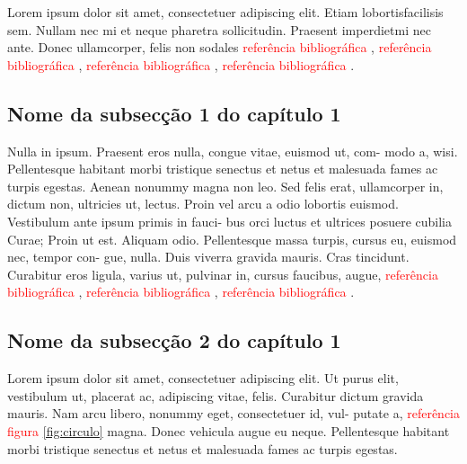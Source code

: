 Lorem  ipsum  dolor  sit  amet,  consectetuer  adipiscing elit. Etiam  lobortisfacilisis sem.  Nullam nec mi et neque pharetra sollicitudin. Praesent imperdietmi nec ante. Donec ullamcorper, felis non sodales \textcolor{red}{referência bibliográfica} \cite{einstein}, \textcolor{red}{referência bibliográfica} \cite{dirac}, \textcolor{red}{referência bibliográfica} \cite{latexcompanion}, \textcolor{red}{referência bibliográfica} \cite{knuthwebsite}.

\subsection{Nome da subsecção 1 do capítulo 1}
Nulla in ipsum. Praesent eros nulla, congue vitae, euismod ut, com- modo a, wisi. Pellentesque habitant morbi tristique senectus et netus et malesuada fames ac turpis egestas. Aenean nonummy magna non leo. Sed felis erat, ullamcorper in, dictum non, ultricies ut, lectus. Proin vel arcu a odio lobortis euismod. Vestibulum ante ipsum primis in fauci- bus orci luctus et ultrices posuere cubilia Curae; Proin ut est. Aliquam odio. Pellentesque massa turpis, cursus eu, euismod nec, tempor con- gue, nulla. Duis viverra gravida mauris. Cras tincidunt. Curabitur eros ligula, varius ut, pulvinar in, cursus faucibus, augue, \textcolor{red}{referência bibliográfica} \cite{knuth-fa}, \textcolor{red}{referência bibliográfica} \cite{knuth-acp}, \textcolor{red}{referência bibliográfica} \cite{ctan}.

\subsection{Nome da subsecção 2 do capítulo 1}
Lorem ipsum dolor sit amet, consectetuer adipiscing elit. Ut purus elit, vestibulum ut, placerat ac, adipiscing vitae, felis. Curabitur dictum gravida mauris. Nam arcu libero, nonummy eget, consectetuer id, vul- putate a, \textcolor{red}{referência figura} \ref{fig:circulo} magna. Donec vehicula augue eu neque. Pellentesque habitant morbi tristique senectus et netus et malesuada fames ac turpis egestas. 

